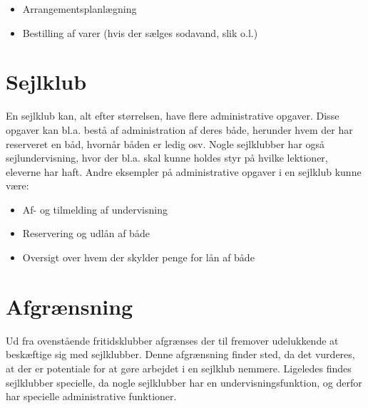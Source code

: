 \begin{itemize}
  \item Arrangementsplanlægning
  \item Bestilling af varer (hvis der sælges sodavand, slik o.l.)
\end{itemize}


\section{Sejlklub}

En sejlklub kan, alt efter størrelsen, have flere administrative opgaver.
Disse opgaver kan bl.a. bestå af administration af deres både, herunder hvem der har reserveret en båd, hvornår båden er ledig osv.
Nogle sejlklubber har også sejlundervisning, hvor der bl.a. skal kunne holdes styr på hvilke lektioner, eleverne har haft. 
Andre eksempler på administrative opgaver i en sejlklub kunne være:

\begin{itemize}
  \item Af- og tilmelding af undervisning
  \item Reservering og udlån af både 
  \item Oversigt over hvem der skylder penge for lån af både
\end{itemize}

\section{Afgrænsning}

Ud fra ovenstående fritidsklubber afgrænses der til fremover udelukkende at beskæftige sig med sejlklubber. 
Denne afgrænsning finder sted, da det vurderes, at der er potentiale for at gøre arbejdet i en sejlklub nemmere. 
Ligeledes findes sejlklubber specielle, da nogle sejlklubber har en undervisningsfunktion, og derfor har specielle administrative funktioner.
